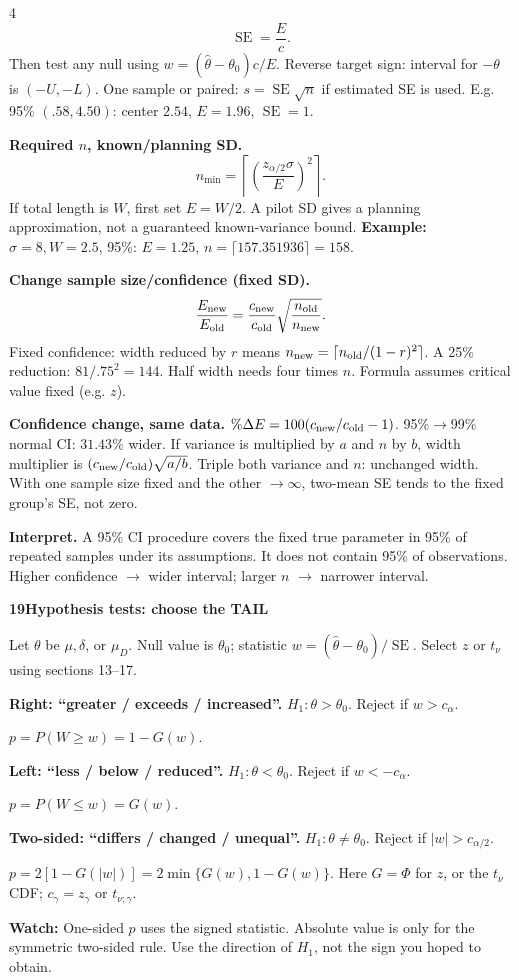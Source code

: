 \documentclass[a4paper,landscape]{article}
\newcommand{\head}[2][late]{\par\vspace{3pt}\noindent\colorbox{#1}{\parbox{\dimexpr\linewidth-6pt}{\color{white}\bfseries #2}}\par\vspace{1pt}}
\newcommand{\cue}[1]{\par\textbf{#1}\enspace}
\newcommand{\trap}[1]{\par{\color{alert}\textbf{Watch:} #1}}
\newcommand{\SE}{\operatorname{SE}}
\newcommand{\col}{\par\vfill\columnbreak}
\begin{document}
\begin{multicols*}{4}
\[ \SE=\frac{E}{c}.\]
Then test any null using \(w=(\hat\theta-\theta_0)c/E\). Reverse target sign: interval for \(-\theta\) is \((-U,-L)\).
One sample or paired: \(s=\SE\sqrt n\) if estimated SE is used. E.g. 95\% \((.58,4.50)\): center \(2.54\), \(E=1.96\), \(\SE=1\).
\cue{Required \(n\), known/planning SD.}
\[n_{\min}=\left\lceil\left(\frac{z_{\alpha/2}\sigma}{E}\right)^2\right\rceil.\]
If total length is \(W\), first set \(E=W/2\). A pilot SD gives a planning approximation, not a guaranteed known-variance bound.
\textbf{Example:} \(\sigma=8,W=2.5\), 95\%: \(E=1.25\), \(n=\lceil157.351936\rceil=158\).
\cue{Change sample size/confidence (fixed SD).}
\[\frac{E_{\rm new}}{E_{\rm old}}=
 \frac{c_{\rm new}}{c_{\rm old}}\sqrt{\frac{n_{\rm old}}{n_{\rm new}}}.\]
Fixed confidence: width reduced by \(r\) means \(n_{\rm new}=\lceil n_{\rm old}/(1-r)^2\rceil\). A 25\% reduction: \(81/.75^2=144\). Half width needs four times \(n\). Formula assumes critical value fixed (e.g. \(z\)).
\cue{Confidence change, same data.}
\(\%\Delta E=100(c_{\rm new}/c_{\rm old}-1)\). 95\%\(\to\)99\% normal CI: \(31.43\%\) wider.
If variance is multiplied by \(a\) and \(n\) by \(b\), width multiplier is \((c_{\rm new}/c_{\rm old})\sqrt{a/b}\). Triple both variance and \(n\): unchanged width. With one sample size fixed and the other \(\to\infty\), two-mean SE tends to the fixed group's SE, not zero.
\cue{Interpret.} A 95\% CI procedure covers the fixed true parameter in 95\% of repeated samples under its assumptions. It does not contain 95\% of observations. Higher confidence \(\to\) wider interval; larger \(n\) \(\to\) narrower interval.
\col
\head{19\quad Hypothesis tests: choose the TAIL}
Let \(\theta\) be \(\mu,\delta\), or \(\mu_D\). Null value is \(\theta_0\); statistic \(w=(\hat\theta-\theta_0)/\SE\). Select \(z\) or \(t_\nu\) using sections 13--17.
\cue{Right: ``greater / exceeds / increased''.}
\(H_1:\theta>\theta_0\). Reject if \(w>c_\alpha\).\par
\(p=P(W\ge w)=1-G(w)\).
\cue{Left: ``less / below / reduced''.}
\(H_1:\theta<\theta_0\). Reject if \(w<-c_\alpha\).\par
\(p=P(W\le w)=G(w)\).
\cue{Two-sided: ``differs / changed / unequal''.}
\(H_1:\theta\ne\theta_0\). Reject if \(|w|>c_{\alpha/2}\).\par
\(p=2[1-G(|w|)]=2\min\{G(w),1-G(w)\}\).
Here \(G=\Phi\) for \(z\), or the \(t_\nu\) CDF; \(c_\gamma=z_\gamma\) or \(t_{\nu;\gamma}\).
\trap{One-sided \(p\) uses the signed statistic. Absolute value is only for the symmetric two-sided rule. Use the direction of \(H_1\), not the sign you hoped to obtain.}

\end{multicols*}
\end{document}
